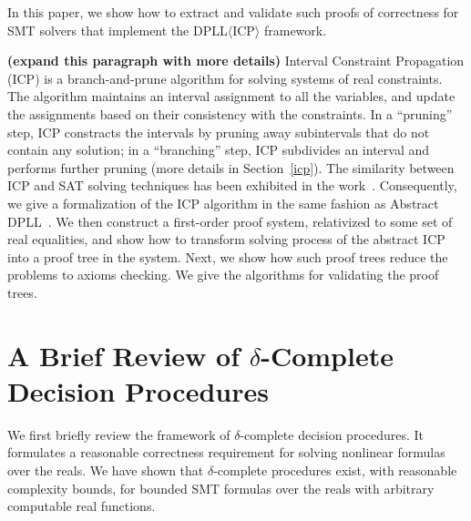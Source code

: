\documentclass[envcountsect]{llncs}
\begin{document}
In this paper, we show how to extract and validate such proofs
of correctness for SMT solvers that implement the DPLL$\langle$ICP$\rangle$
framework. 

{\bf (expand this paragraph with more details)}
Interval Constraint Propagation (ICP) is a branch-and-prune algorithm for
solving systems of real constraints. The algorithm maintains an interval
assignment to all the variables, and update the  assignments based on their
consistency with the constraints. In a ``pruning''
step, ICP constracts the intervals by pruning away subintervals that do not
contain any solution; in a ``branching'' step, ICP subdivides an interval and
performs further pruning (more details in Section~\ref{icp}). The similarity
between ICP and SAT solving techniques has been exhibited in the work~\cite{}.
Consequently, we give a formalization of the ICP algorithm in the same fashion
as Abstract DPLL~\cite{}. We then construct a first-order proof system,
relativized to some set of real equalities, and show how to transform solving
process of the abstract ICP into a proof tree in the system. Next, we show how
such proof trees reduce the problems to axioms checking. We give the algorithms
for validating the proof trees. 

\newpage

\section{A Brief Review of $\delta$-Complete Decision Procedures}\label{review}

We first briefly review the framework of $\delta$-complete decision procedures.
It formulates a reasonable correctness requirement for solving nonlinear
formulas over the reals. We have shown that $\delta$-complete procedures exist,
with reasonable complexity bounds, for bounded SMT formulas over the reals with
arbitrary computable real functions. 
\end{document}
